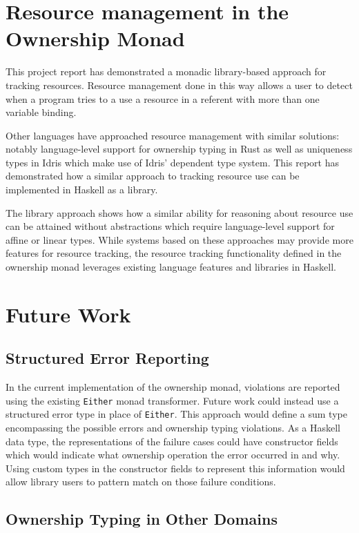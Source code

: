 \documentclass[onehalf,11pt]{beavtex}
\begin{document}
\section{Resource management in the Ownership Monad}

This project report has demonstrated a monadic library-based approach for
tracking resources.
Resource management done in this way allows a user to detect when a program
tries to a use a resource in a referent with more than one variable binding.

Other languages have approached resource management with similar solutions:
notably language-level support for ownership typing in Rust as well as
uniqueness types in Idris which make use of Idris' dependent type system.
This report has demonstrated how a similar approach to tracking resource use
can be implemented in Haskell as a library.

The library approach shows how a similar ability for reasoning about resource
use can be attained without abstractions which require language-level support
for affine or linear types.
While systems based on these approaches may provide more features for resource
tracking, the resource tracking functionality defined in the ownership
monad leverages existing language features and libraries in Haskell.

\section{Future Work} \label{future}

\subsection{Structured Error Reporting} \label{error}

In the current implementation of the ownership monad, violations are reported
using the existing \texttt{Either} monad transformer. Future work could instead
use a structured error type in place of \texttt{Either}. 
This approach would define a sum type encompassing the possible errors and
ownership typing violations.
As a Haskell data type, the representations of the failure cases could have
constructor fields which would indicate what ownership operation the error
occurred in and why.
Using custom types in the constructor fields to represent this information
would allow library users to pattern match on those failure conditions.


\subsection{Ownership Typing in Other Domains}
\end{document}
